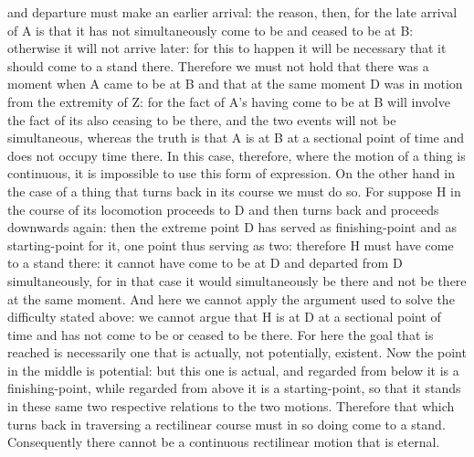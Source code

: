 and departure must make an earlier arrival: the reason, then, for
the late arrival of A is that it has not simultaneously come to be
and ceased to be at B: otherwise it will not arrive later: for this
to happen it will be necessary that it should come to a stand there.
Therefore we must not hold that there was a moment when A came to
be at B and that at the same moment D was in motion from the extremity
of Z: for the fact of A's having come to be at B will involve the
fact of its also ceasing to be there, and the two events will not
be simultaneous, whereas the truth is that A is at B at a sectional
point of time and does not occupy time there. In this case, therefore,
where the motion of a thing is continuous, it is impossible to use
this form of expression. On the other hand in the case of a thing
that turns back in its course we must do so. For suppose H in the
course of its locomotion proceeds to D and then turns back and proceeds
downwards again: then the extreme point D has served as finishing-point
and as starting-point for it, one point thus serving as two: therefore
H must have come to a stand there: it cannot have come to be at D
and departed from D simultaneously, for in that case it would simultaneously
be there and not be there at the same moment. And here we cannot apply
the argument used to solve the difficulty stated above: we cannot
argue that H is at D at a sectional point of time and has not come
to be or ceased to be there. For here the goal that is reached is
necessarily one that is actually, not potentially, existent. Now the
point in the middle is potential: but this one is actual, and regarded
from below it is a finishing-point, while regarded from above it is
a starting-point, so that it stands in these same two respective relations
to the two motions. Therefore that which turns back in traversing
a rectilinear course must in so doing come to a stand. Consequently
there cannot be a continuous rectilinear motion that is eternal.

